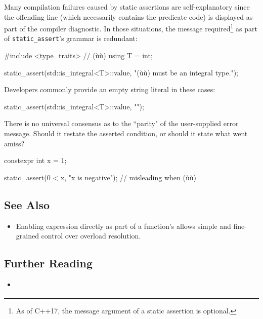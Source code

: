 Many compilation failures caused by static assertions are
self-explanatory since the offending line (which necessarily contains the
predicate code) is displayed as part of the compiler diagnostic. In
those situations, the message required{\cprotect\footnote{As of C++17,
  the message argument of a static assertion is optional.}} as part of
\lstinline!static_assert!'s grammar is redundant:

\begin{emcppshiddenlisting}[emcppsbatch=e7]
#include <type_traits>  // (ù{}ù)
using T = int;
\end{emcppshiddenlisting}
\begin{emcppslisting}[emcppsbatch=e7]
static_assert(std::is_integral<T>::value, "(ù{}ù) must be an integral type.");
\end{emcppslisting}

\noindent Developers commonly provide an empty string literal in these
cases:

\begin{emcppslisting}[emcppsbatch=e7]
static_assert(std::is_integral<T>::value, "");
\end{emcppslisting}

There is no universal consensus as to the ``parity" of the user-supplied error message.  Should it restate the asserted condition, or should it state what went amiss?
\begin{emcppshiddenlisting}[emcppsbatch=e8]
constexpr int x = 1;
\end{emcppshiddenlisting}
\begin{emcppslisting}[emcppsbatch=e8]
static_assert(0 < x, "x is negative");
   // misleading when (ù{}ù)
\end{emcppslisting}

\subsection[See Also]{See Also}\label{see-also}

\begin{itemize}
\item{%
Enabling expression  directly as part of a function's   allows simple and fine-grained control over overload resolution.}
\end{itemize}

\subsection[Further Reading]{Further Reading}\label{further-reading}

\begin{itemize}
\item{\cite{klarer04}}
\end{itemize}


